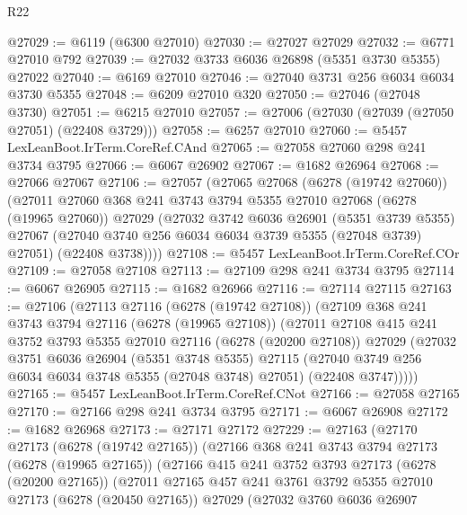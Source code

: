 \begin{lexlean}{R22}
\begin{coremodule}
@27029 := @6119 (@6300 @27010)
@27030 := @27027 @27029
@27032 := @6771 @27010 @792
@27039 := @27032 @3733 @6036 @26898 (@5351 @3730 @5355) @27022
@27040 := @6169 @27010
@27046 := @27040 @3731 @256 @6034 @6034 @3730 @5355
@27048 := @6209 @27010 @320
@27050 := @27046 (@27048 @3730)
@27051 := @6215 @27010
@27057 := @27006 (@27030 (@27039 (@27050 @27051) (@22408 @3729)))
@27058 := @6257 @27010
@27060 := @5457 LexLeanBoot.IrTerm.CoreRef.CAnd
@27065 := @27058 @27060 @298 @241 @3734 @3795
@27066 := @6067 @26902
@27067 := @1682 @26964
@27068 := @27066 @27067
@27106 := @27057
    (@27065
      @27068
      (@6278 (@19742 @27060))
      (@27011
        @27060
        @368
        @241
        @3743
        @3794
        @5355
        @27010
        @27068
        (@6278 (@19965 @27060))
        @27029
        (@27032
          @3742
          @6036
          @26901
          (@5351 @3739 @5355)
          @27067
          (@27040 @3740 @256 @6034 @6034 @3739 @5355 (@27048 @3739) @27051)
          (@22408 @3738))))
@27108 := @5457 LexLeanBoot.IrTerm.CoreRef.COr
@27109 := @27058 @27108
@27113 := @27109 @298 @241 @3734 @3795
@27114 := @6067 @26905
@27115 := @1682 @26966
@27116 := @27114 @27115
@27163 := @27106
    (@27113
      @27116
      (@6278 (@19742 @27108))
      (@27109
        @368
        @241
        @3743
        @3794
        @27116
        (@6278 (@19965 @27108))
        (@27011
          @27108
          @415
          @241
          @3752
          @3793
          @5355
          @27010
          @27116
          (@6278 (@20200 @27108))
          @27029
          (@27032
            @3751
            @6036
            @26904
            (@5351 @3748 @5355)
            @27115
            (@27040 @3749 @256 @6034 @6034 @3748 @5355 (@27048 @3748) @27051)
            (@22408 @3747)))))
@27165 := @5457 LexLeanBoot.IrTerm.CoreRef.CNot
@27166 := @27058 @27165
@27170 := @27166 @298 @241 @3734 @3795
@27171 := @6067 @26908
@27172 := @1682 @26968
@27173 := @27171 @27172
@27229 := @27163
    (@27170
      @27173
      (@6278 (@19742 @27165))
      (@27166
        @368
        @241
        @3743
        @3794
        @27173
        (@6278 (@19965 @27165))
        (@27166
          @415
          @241
          @3752
          @3793
          @27173
          (@6278 (@20200 @27165))
          (@27011
            @27165
            @457
            @241
            @3761
            @3792
            @5355
            @27010
            @27173
            (@6278 (@20450 @27165))
            @27029
            (@27032
              @3760
              @6036
              @26907

\end{coremodule}
\end{lexlean}
